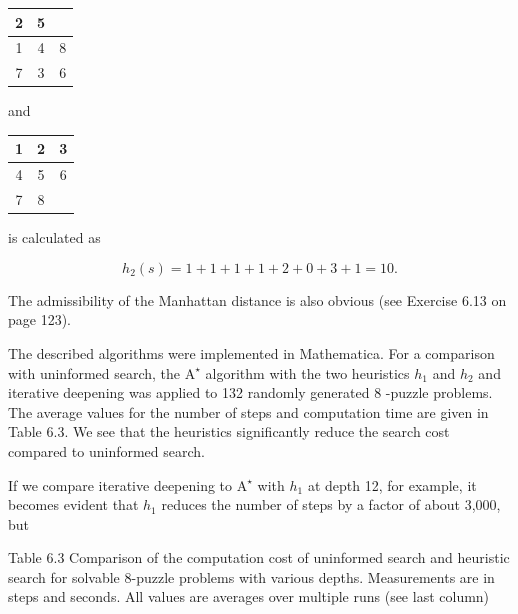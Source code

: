 \documentclass[10pt]{book}
\begin{document}
\begin{center}
\begin{tabular}{|c|c|c|}
\hline
2 & 5 &  \\
\hline
1 & 4 & 8 \\
\hline
7 & 3 & 6 \\
\hline\hline
\end{tabular}
\quad and \quad
\begin{tabular}{|c|c|c|}
\hline
1 & 2 & 3 \\
\hline
4 & 5 & 6 \\
\hline
7 & 8 &  \\
\hline
\end{tabular}
\end{center}

is calculated as

$$
h_{2}(s)=1+1+1+1+2+0+3+1=10.
$$

The admissibility of the Manhattan distance is also obvious (see Exercise 6.13 on page 123).

The described algorithms were implemented in Mathematica. For a comparison with uninformed search, the $\mathrm{A}^{\star}$ algorithm with the two heuristics $h_{1}$ and $h_{2}$ and iterative deepening was applied to 132 randomly generated 8 -puzzle problems. The average values for the number of steps and computation time are given in Table 6.3. We see that the heuristics significantly reduce the search cost compared to uninformed search.

If we compare iterative deepening to $\mathrm{A}^{\star}$ with $h_{1}$ at depth 12, for example, it becomes evident that $h_{1}$ reduces the number of steps by a factor of about 3,000, but

Table 6.3 Comparison of the computation cost of uninformed search and heuristic search for solvable 8-puzzle problems with various depths. Measurements are in steps and seconds. All values are averages over multiple runs (see last column)
\end{document}
